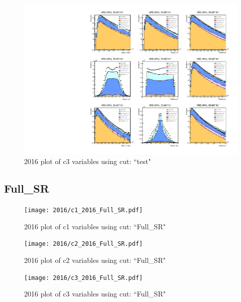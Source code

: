 \documentclass{article}
\begin{document}
                        \begin{figure}[H]
                            \centering
                            \caption{2016 plot of c3 variables using cut: ``test"}
                            \includegraphics[width=\textwidth]{2016/c3_2016_test.pdf}
                        \end{figure}    
      \subsection*{Full\_SR}
                        \begin{figure}[H]
                            \centering
                            \caption{2016 plot of c1 variables using cut: ``Full\_SR"}
                            \texttt{[image: 2016/c1\_2016\_Full\_SR.pdf]}
                        \end{figure}    
                        \begin{figure}[H]
                            \centering
                            \caption{2016 plot of c2 variables using cut: ``Full\_SR"}
                            \texttt{[image: 2016/c2\_2016\_Full\_SR.pdf]}
                        \end{figure}    
                        \begin{figure}[H]
                            \centering
                            \caption{2016 plot of c3 variables using cut: ``Full\_SR"}
                            \texttt{[image: 2016/c3\_2016\_Full\_SR.pdf]}
                        \end{figure}    
\end{document}
